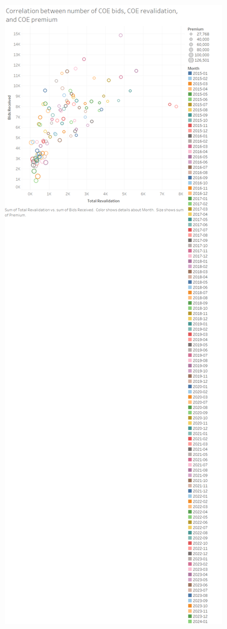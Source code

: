 \documentclass[a4paper, 11pt]{article}
\begin{document}
\begin{center}
\includegraphics[width=.9\linewidth]{./charts/reval-bids-premium.png}
\end{center}
\end{document}
